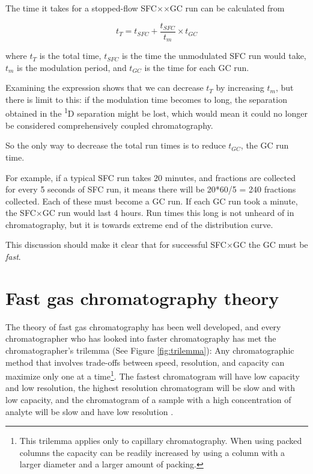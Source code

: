 The time it takes for a stopped-flow SFC×$\times$GC run can be calculated from

\[t_{T} = t_{SFC} + \frac{t_{SFC}}{t_{m}} \times t_{GC}\]

where \(t_T\) is the total time, \(t_{SFC}\) is the time the unmodulated SFC run
would take, \(t_m\) is the modulation period, and \(t_{GC}\) is the time for
each GC run.

Examining the expression shows that we can decrease \(t_T\) by increasing
\(t_m\), but there is limit to this: if the modulation time becomes to long, the
separation obtained in the \textsuperscript{1}D separation might be lost, which
would mean it could no longer be considered comprehensively coupled
chromatography.

So the only way to decrease the total run times is to reduce \(t_{GC}\), the GC
run time.

For example, if a typical SFC run takes 20 minutes, and fractions are collected
for every 5 seconds of SFC run, it means there will be 20*60/5 = 240 fractions
collected. Each of these must become a GC run. If each GC run took a minute, the
SFC$\times$GC run would last 4 hours. Run times this long is not unheard of in
chromatography, but it is towards extreme end of the distribution curve. 

This discussion should make it clear that for successful SFC$\times$GC the GC
must be \textit{fast}.

\section{Fast gas chromatography theory}

The theory of fast gas chromatography has been well developed, and every chromatographer who has looked into faster
chromatography has met the chromatographer's trilemma (See Figure
\ref{fig:trilemma}): Any chromatographic method that involves trade-offs between
speed, resolution, and capacity can maximize only one at a time\footnote{This
trilemma applies only to capillary chromatography. When using packed columns the capacity
can be readily increased by using a column with a larger diameter and a larger
amount of packing.}. The fastest chromatogram will have low capacity and low
resolution, the highest resolution chromatogram will be slow and with low
capacity, and the chromatogram of a sample with a high concentration of analyte
will be slow and have low resolution \autocite{Klee2002}.

